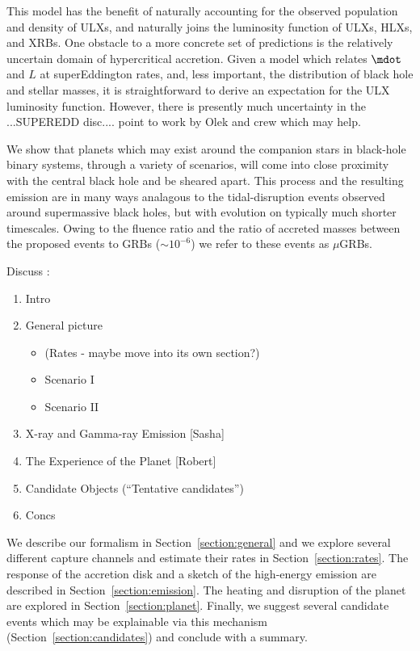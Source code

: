 This model has the benefit of naturally accounting for the observed population and density of ULXs, and naturally joins the luminosity function of ULXs, HLXs, and XRBs.  One obstacle to a more concrete set of predictions is the relatively uncertain domain of hypercritical accretion.  Given a model which relates $\mdot$ and $L$ at superEddington rates, and, less important, the distribution of black hole and stellar masses, it is straightforward to derive an expectation for the ULX luminosity function.  However, there is presently much uncertainty in the ...SUPEREDD disc.... point to work by Olek and crew which may help.















We show that planets which may exist around the companion stars in
black-hole binary systems, through a variety of scenarios, will come
into close proximity with the central black hole and be sheared apart.
This process and the resulting emission are in many ways analagous to
the tidal-disruption events observed around supermassive black holes,
but with evolution on typically much shorter timescales.  Owing to the
fluence ratio and the ratio of accreted masses between the proposed
events to GRBs ($\sim 10^{-6}$) we refer to these events as $\mu$GRBs.


Discuss : 
\begin{enumerate}
\item  Intro  
\item  General picture  
\begin{itemize}
\item (Rates - maybe move into its own section?) 
\item  Scenario I   
\item  Scenario II  
\end{itemize}
\item  X-ray and Gamma-ray Emission [Sasha] 
\item  The Experience of the Planet [Robert] 
\item  Candidate Objects (``Tentative candidates'') 
\item  Concs  
\end{enumerate}


We describe our formalism in Section~\ref{section:general} and we
explore several different capture channels and estimate their rates in
Section~\ref{section:rates}.  The response of the accretion disk and a
sketch of the high-energy emission are described in
Section~\ref{section:emission}.  The heating and disruption of the
planet are explored in Section~\ref{section:planet}.  Finally, we
suggest several candidate events which may be explainable via this
mechanism (Section~\ref{section:candidates}) and conclude with a
summary.
